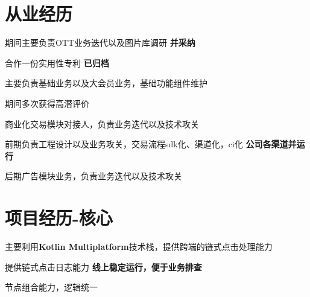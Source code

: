 \documentclass[]{deedy-resume-openfont}
\begin{document}
\begin{minipage}[t]{0.73\textwidth} 


\section{从业经历}
\sectionsep
{}
\vspace{0.1em}
\vspace{\topsep}
\begin{tightemize}
    \item 期间主要负责OTT业务迭代以及图片库调研 \textbf{并采纳}
    \item 合作一份实用性专利 \textbf{已归档}
\end{tightemize}
\sectionsep

\vspace{0.1em}
\begin{tightemize}
    \item 主要负责基础业务以及大会员业务，基础功能组件维护
    \item 期间多次获得高潜评价
\end{tightemize}
\sectionsep

\vspace{0.1em}
\begin{tightemize}
    \item 商业化交易模块对接人，负责业务迭代以及技术攻关
    \item 前期负责工程设计以及业务攻关，交易流程sdk化、渠道化，ci化 \textbf{公司各渠道并运行}
    \item 后期广告模块业务，负责业务迭代以及技术攻关
\end{tightemize}
\sectionsep


\section{项目经历-核心}
\sectionsep
{}
\vspace{0.1em}
\vspace{0.1em}
\begin{tightemize}
    \item 主要利用\textbf{Kotlin Multiplatform}技术栈，提供跨端的链式点击处理能力
    \item 提供链式点击日志能力 \textbf{线上稳定运行，便于业务排查}
    \item 节点组合能力，逻辑统一
    \end{tightemize}
\sectionsep


\end{minipage}
\end{document}
